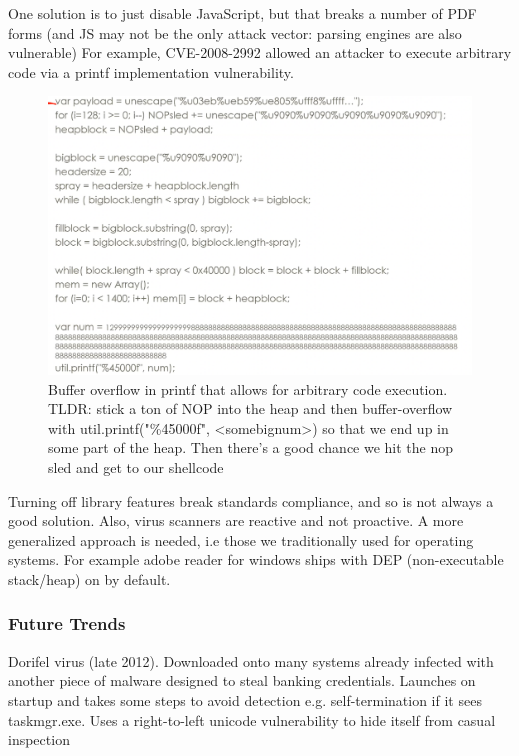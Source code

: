 \documentclass[../notes.tex]{subfiles}
\begin{document}
One solution is to just disable JavaScript, but that breaks a number of PDF forms (and JS may not be the only attack vector: parsing engines are also vulnerable)
For example, CVE-2008-2992 allowed an attacker to execute arbitrary code via a printf implementation vulnerability.

\begin{figure}[H]
    \centering
    \includegraphics[width=0.8\linewidth]{img/image_2023-04-03-19-31-52.png}
    \caption{Buffer overflow in printf that allows for arbitrary code execution. TLDR: stick a ton of NOP into the heap and then buffer-overflow with util.printf("\%45000f", <somebignum>) so that we end up in some part of the heap. Then there's a good chance we hit the nop sled and get to our shellcode}
\end{figure}


Turning off library features break standards compliance, and so is not always a good solution.
Also, virus scanners are reactive and not proactive. A more generalized approach is needed, i.e those we traditionally used for operating systems. For example adobe reader for windows ships with DEP (non-executable stack/heap) on by default.

\subsubsection{Future Trends}

Dorifel virus (late 2012). Downloaded onto many systems already infected with another piece of malware designed to steal banking credentials. Launches on startup and takes some steps to avoid detection e.g. self-termination if it sees taskmgr.exe. Uses a right-to-left unicode vulnerability to hide itself from casual inspection
\end{document}
